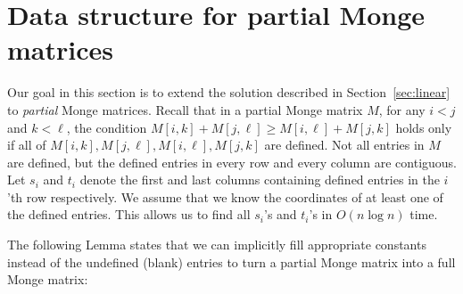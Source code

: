 \documentclass{llncs}
\begin{document}
\section{Data structure for partial Monge matrices}
\label{sec:partial}
Our goal in this section is to extend the solution described in Section~\ref{sec:linear} to \emph{partial}
Monge matrices. Recall that in a partial Monge matrix $M$, for any
$i<j$ and $k < \ell$, the condition $M[i,k]+M[j,\ell] \ge
M[i,\ell]+M[j,k]$ holds only if all of $M[i,k],M[j,\ell],M[i,\ell],M[j,k]$
are defined. Not all entries in $M$ are defined, but the defined
entries in every row and every column are contiguous. Let $s_{i}$ and $t_{i}$ denote the first and last columns containing defined entries in the $i$'th row respectively. 
We assume that we know the coordinates
of at least one of the defined entries. This allows us to find all $s_{i}$'s and $t_{i}$'s in $O(n\log n)$ time.

The following Lemma states that we can implicitly fill appropriate constants instead of the undefined (blank) entries to turn a partial Monge matrix into a full Monge matrix:
 
\end{document}
